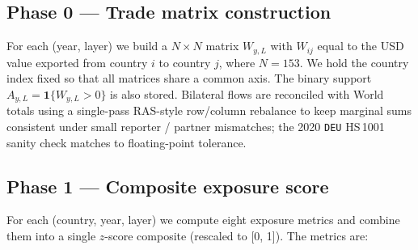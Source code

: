 \documentclass[11pt,a4paper]{article}
\begin{document}
\subsection{Phase 0 --- Trade matrix construction}

For each (year, layer) we build a $N \!\times\! N$ matrix
$W_{y,L}$ with $W_{ij}$ equal to the USD value exported from country
$i$ to country $j$, where $N = 153$. We hold the country index fixed so
that all matrices share a common axis. The binary support
$A_{y,L} = \mathbf{1}\{W_{y,L} > 0\}$ is also stored. Bilateral flows
are reconciled with World totals using a single-pass
RAS-style row/column rebalance to keep marginal sums consistent under
small reporter / partner mismatches; the 2020 \texttt{DEU} HS\,1001
sanity check matches to floating-point tolerance.

\subsection{Phase 1 --- Composite exposure score}

For each (country, year, layer) we compute eight exposure metrics and
combine them into a single $z$-score composite (rescaled to
[0, 1]). The metrics are:
\end{document}
